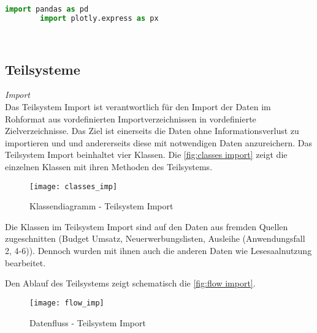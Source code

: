     \begin{lstlisting}[language=Python, caption=Python example]
        import pandas as pd
        import plotly.express as px

        
    \end{lstlisting}

    \subsection{Teilsysteme}
    
    \textit{Import}\\
    Das Teilsystem Import ist verantwortlich für den Import der Daten im Rohformat aus vordefinierten Importverzeichnissen in vordefinierte Zielverzeichnisse. Das Ziel
    ist einerseits die Daten ohne Informationsverlust zu importieren und und andererseits diese mit notwendigen Daten anzureichern. 
    Das Teilsystem Import beinhaltet vier Klassen. Die \autoref{fig:classes import} zeigt die einzelnen Klassen mit ihren Methoden des 
    Teilsystems.
    
    \begin{figure}[H]
        \centering
            \texttt{[image: classes\_imp]}
            \caption{Klassendiagramm - Teilsystem Import}
            \label{fig:classes import}
    \end{figure}

    Die Klassen im Teilsystem Import sind auf den Daten aus fremden Quellen zugeschnitten
    (Budget Umsatz, Neuerwerbungslisten, Ausleihe (Anwendungsfall 2, 4-6)). Dennoch wurden mit ihnen auch die anderen Daten
    wie Lesesaalnutzung bearbeitet.

    Den Ablauf des Teilsystems zeigt schematisch die \autoref{fig:flow import}.

    \begin{figure}[H]
        \centering
            \texttt{[image: flow\_imp]}
            \caption{Datenfluss - Teilsystem Import}
            \label{fig:flow import}
    \end{figure}

